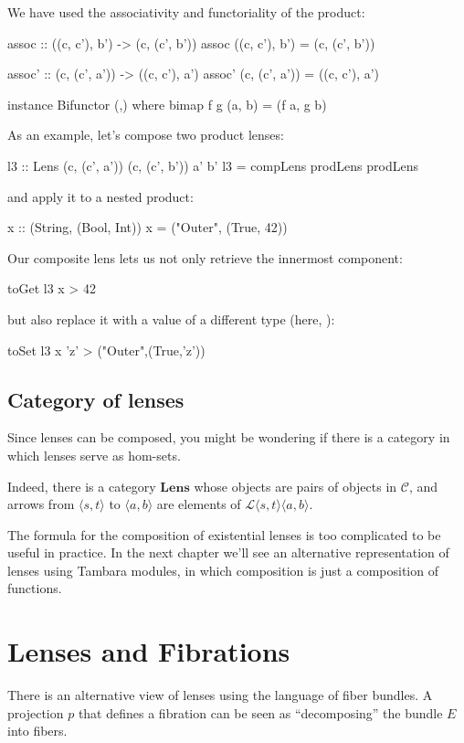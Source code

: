 \documentclass[DaoFP]{subfiles}
\begin{document}
We have used the associativity and functoriality of the product:
\begin{haskell}
assoc :: ((c, c'), b') -> (c, (c', b'))
assoc ((c, c'), b') = (c, (c', b'))

assoc' :: (c, (c', a')) -> ((c, c'), a')
assoc' (c, (c', a')) = ((c, c'), a')

instance Bifunctor (,) where
  bimap f g (a, b) = (f a, g b)
\end{haskell}

As an example, let's compose two product lenses:
\begin{haskell}
l3 :: Lens (c, (c', a')) (c, (c', b')) a' b'
l3 = compLens prodLens prodLens
\end{haskell}
and apply it to a nested product:
\begin{haskell}
x :: (String, (Bool, Int))
x = ("Outer", (True, 42))
\end{haskell}
Our composite lens lets us not only retrieve the innermost component:
\begin{haskell}
toGet l3 x
> 42
\end{haskell}
but also replace it with a value of a different type (here, ):
\begin{haskell}
toSet l3 x 'z'
> ("Outer",(True,'z'))
\end{haskell}

\subsection{Category of lenses}

Since lenses can be composed, you might be wondering if there is a category in which lenses serve as hom-sets. 

Indeed, there is a category $\mathbf{Lens}$ whose objects are pairs of objects in $\mathcal{C}$, and arrows from $\langle s, t\rangle$ to $ \langle a, b \rangle$ are elements of  $\mathcal{L} \langle s, t\rangle \langle a, b \rangle$.

The formula for the composition of existential lenses is too complicated to be useful in practice. In the next chapter we'll see an alternative representation of lenses using Tambara modules, in which composition is just a composition of functions.

\section{Lenses and Fibrations}

There is an alternative view of lenses using the language of fiber bundles. A projection $p$ that defines a fibration can be seen as ``decomposing'' the bundle $E$ into fibers. 
\end{document}
